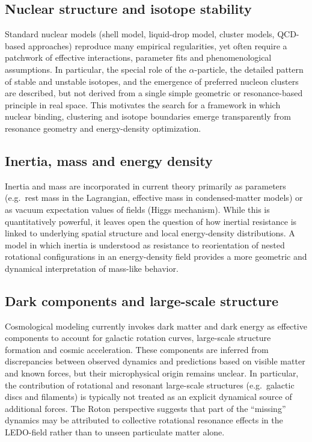 \documentclass[11pt,a4paper]{article}
\begin{document}
\subsection{Nuclear structure and isotope stability}

Standard nuclear models (shell model, liquid-drop model, cluster models, QCD-based approaches) reproduce many empirical regularities, yet often require a patchwork of effective interactions, parameter fits and phenomenological assumptions. In particular, the special role of the $\alpha$-particle, the detailed pattern of stable and unstable isotopes, and the emergence of preferred nucleon clusters are described, but not derived from a single simple geometric or resonance-based principle in real space. This motivates the search for a framework in which nuclear binding, clustering and isotope boundaries emerge transparently from resonance geometry and energy-density optimization.

\subsection{Inertia, mass and energy density}

Inertia and mass are incorporated in current theory primarily as parameters (e.g.\ rest mass in the Lagrangian, effective mass in condensed-matter models) or as vacuum expectation values of fields (Higgs mechanism). While this is quantitatively powerful, it leaves open the question of how inertial resistance is linked to underlying spatial structure and local energy-density distributions. A model in which inertia is understood as resistance to reorientation of nested rotational configurations in an energy-density field provides a more geometric and dynamical interpretation of mass-like behavior.

\subsection{Dark components and large-scale structure}

Cosmological modeling currently invokes dark matter and dark energy as effective components to account for galactic rotation curves, large-scale structure formation and cosmic acceleration. These components are inferred from discrepancies between observed dynamics and predictions based on visible matter and known forces, but their microphysical origin remains unclear. In particular, the contribution of rotational and resonant large-scale structures (e.g.\ galactic discs and filaments) is typically not treated as an explicit dynamical source of additional forces. The Roton perspective suggests that part of the ``missing'' dynamics may be attributed to collective rotational resonance effects in the LEDO-field rather than to unseen particulate matter alone.
\end{document}
